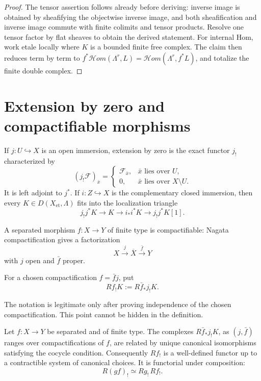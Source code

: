 \begin{proof}
The tensor assertion follows already before deriving: inverse image is
obtained by sheafifying the objectwise inverse image, and both sheafification
and inverse image commute with finite colimits and tensor products.  Resolve
one tensor factor by flat sheaves to obtain the derived statement.  For
internal Hom, work etale locally where \(K\) is a bounded finite free complex.
The claim then reduces term by term to
\(f^*\mathcal Hom(\Lambda^r,L)=\mathcal Hom(\Lambda^r,f^*L)\), and totalize the
finite double complex.
\end{proof}

\section{Extension by zero and compactifiable morphisms}

If \(j:U\hookrightarrow X\) is an open immersion, extension by zero is the
exact functor \(j_!\) characterized by
\[
  (j_!\mathcal F)_{\bar x}=
  \begin{cases}
    \mathcal F_{\bar x},&\bar x\text{ lies over }U,\\
    0,&\bar x\text{ lies over }X\setminus U.
  \end{cases}
\]
It is left adjoint to \(j^*\).  If \(i:Z\hookrightarrow X\) is the
complementary closed immersion, then every \(K\in D(X_{\mathrm{et}},\Lambda)\)
fits into the localization triangle
\[
  j_!j^*K\longrightarrow K\longrightarrow i_*i^*K
  \longrightarrow j_!j^*K[1].
\]

A separated morphism \(f:X\to Y\) of finite type is compactifiable:
Nagata compactification gives a factorization
\[
  X\xrightarrow{j}\overline X\xrightarrow{\bar f}Y
\]
with \(j\) open and \(\bar f\) proper.

\begin{definition}
\label{def:Rfshriek}
For a chosen compactification \(f=\bar f j\), put
\[
  Rf_!K:=R\bar f_*j_!K.
\]
\end{definition}

The notation is legitimate only after proving independence of the chosen
compactification.  This point cannot be hidden in the definition.

\begin{theorem}
\label{thm:Rfshriek-independence}
Let \(f:X\to Y\) be separated and of finite type.  The complexes
\(R\bar f_*j_!K\), as \((j,\bar f)\) ranges over compactifications of \(f\),
are related by unique canonical isomorphisms satisfying the cocycle condition.
Consequently \(Rf_!\) is a well-defined functor up to a contractible system of
canonical choices.  It is functorial under composition:
\[
  R(gf)_!\simeq Rg_!\,Rf_!.
\]
\end{theorem}

